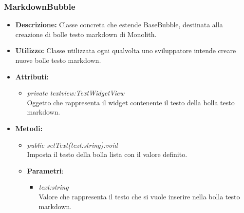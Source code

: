 \subsubsection{MarkdownBubble}
\begin{itemize}
\item \textbf{Descrizione:} Classe concreta che estende BaseBubble, destinata alla creazione di bolle testo markdown di Monolith.
\item \textbf{Utilizzo:} Classe utilizzata ogni qualvolta uno sviluppatore intende creare nuove bolle testo markdown.
\item \textbf{Attributi:}
\begin{itemize}
\item \textit{private textview:TextWidgetView}\\
Oggetto che rappresenta il widget contenente il testo della bolla testo markdown.
\end{itemize}
\item \textbf{Metodi:}
\begin{itemize}
\item \textit{public setText(text:string):void}\\
Imposta il testo della bolla lista con il valore definito.
\item{\textbf{Parametri}: \begin{itemize}
\item \textit{text:string}\\
Valore che rappresenta il testo che si vuole inserire nella bolla testo markdown.
\end{itemize}}
\end{itemize}
\end{itemize}

